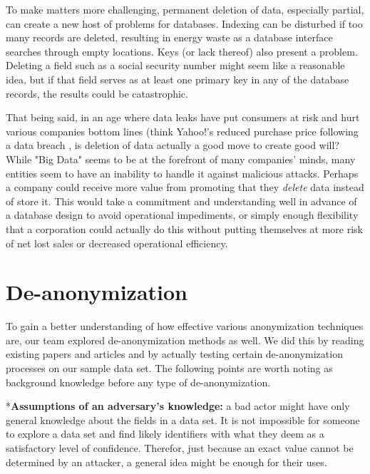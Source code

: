 \documentclass[10pt,journal,compsoc]{IEEEtran}
\begin{document}
	To make matters more challenging, permanent deletion of data, especially partial, can create a new host of problems for databases.  Indexing can be disturbed if too many records are deleted, resulting in energy waste as a database interface searches through empty locations.  Keys (or lack thereof) also present a problem.  Deleting a field such as a social security number might seem like a reasonable idea, but if that field serves as at least one primary key in any of the database records, the results could be catastrophic.\linebreak

	That being said, in an age where data leaks have put consumers at risk and hurt various companies bottom lines (think Yahoo!'s reduced purchase price following a data breach \cite{albanesius} , is deletion of data actually a good move to create good will? While "Big Data" seems to be at the forefront of many companies' minds, many entities seem to have an inability to handle it against malicious attacks.  Perhaps a company could receive more value from promoting that they \textit{delete} data instead of store it.  This would take a commitment and understanding well in advance of a database design to avoid operational impediments, or simply enough flexibility that a corporation could actually do this without putting themselves at more risk of net lost sales or decreased operational efficiency.


\section{De-anonymization}
	To gain a better understanding of how effective various anonymization techniques are, our team explored de-anonymization methods as well.  We did this by reading existing papers and articles and by actually testing certain de-anonymization processes on our sample data set.
	The following points are worth noting as background knowledge before any type of de-anonymization. \linebreak

	*\textbf{Assumptions of an adversary's knowledge:} a bad actor might have only general knowledge about the fields in a data set.  It is not impossible for someone to explore a data set and find likely identifiers with what they deem as a satisfactory level of confidence.  Therefor, just because an exact value cannot be determined by an attacker, a general idea might be enough for their uses.\linebreak
	
\end{document}
